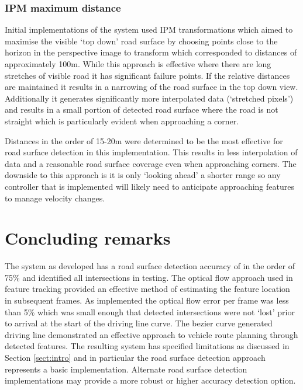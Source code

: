 \documentclass[]{aiaa-tc}%
\begin{document}
\subsubsection{IPM maximum distance}\label{s:ipmMaxDist}

Initial implementations of the system used IPM transformations which aimed to maximise the visible `top down' road surface by choosing points close to the horizon in the perspective image to transform which corresponded to distances of approximately 100m. While this approach is effective where there are long stretches of visible road it has significant failure points. If the relative distances are maintained it results in a narrowing of the road surface in the top down view. Additionally it generates significantly more interpolated data (`stretched pixels') and results in a small portion of detected road surface where the road is not straight which is particularly evident when approaching a corner. 

Distances in the order of 15-20m were determined to be the most effective for road surface detection in this implementation. This results in less interpolation of data and a reasonable road surface coverage even when approaching corners. The downside to this approach is it is only `looking ahead' a shorter range so any controller that is implemented will likely need to anticipate approaching features to manage velocity changes. 


\section{Concluding remarks}

The system as developed has a road surface detection accuracy of in the order of 75\% and identified all intersections in testing. The optical flow approach used in feature tracking provided an effective method of estimating the feature location in subsequent frames. As implemented the optical flow error per frame was less than 5\% which was small enough that detected intersections were not `lost' prior to arrival at the start of the driving line curve. The bezier curve generated driving line demonstrated an effective approach to vehicle route planning through detected features. The resulting system has specified limitations as discussed in Section \ref{sect:intro} and in particular the road surface detection approach represents a basic implementation. Alternate road surface detection implementations may provide a more robust or higher accuracy detection option.
\end{document}
